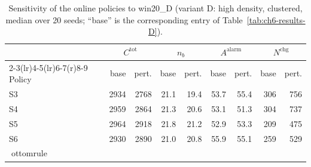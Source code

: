 \begin{table}[htbp]
\centering
\caption{Sensitivity of the online policies to win20_D (variant D: high density, clustered,
median over 20 seeds; ``base'' is the corresponding entry of
Table~\ref{tab:ch6-results-D}).}
\label{tab:ch6-sens-D-win20}
\footnotesize
\begin{tabular}{@{}l rr rr rr rr@{}}
\toprule
& \multicolumn{2}{c}{$C^{\mathrm{tot}}$} & \multicolumn{2}{c}{$n_b$}
  & \multicolumn{2}{c}{$A^{\mathrm{alarm}}$} & \multicolumn{2}{c}{$N^{\mathrm{chg}}$} \\
\cmidrule(r){2-3}\cmidrule(lr){4-5}\cmidrule(lr){6-7}\cmidrule(r){8-9}
Policy & base & pert. & base & pert. & base & pert. & base & pert. \\
\midrule

S3 & 2934 & 2768 & 21.1 & 19.4 & 53.7 & 55.4 & 306 & 756 \\
S4 & 2959 & 2864 & 21.3 & 20.6 & 53.1 & 51.3 & 304 & 737 \\
S5 & 2964 & 2918 & 21.8 & 21.2 & 52.9 & 53.3 & 209 & 475 \\
S6 & 2930 & 2890 & 21.0 & 20.8 & 55.9 & 55.1 & 259 & 529 \\
ottomrule
\end{tabular}
\end{table}
